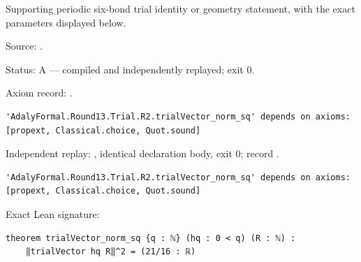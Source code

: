 \begin{theorem}[bp-432]
\label{bp-432}
\leanok
Supporting periodic six-bond trial identity or geometry statement, with the exact parameters displayed below.

\par Source: \texttt{}.
\par Status: A — compiled and independently replayed; exit 0.
\par Axiom record: \texttt{}.
\begin{verbatim}
'AdalyFormal.Round13.Trial.R2.trialVector_norm_sq' depends on axioms: [propext, Classical.choice, Quot.sound]
\end{verbatim}
\par Independent replay: \texttt{}, identical declaration body, exit 0; record \texttt{}.
\begin{verbatim}
'AdalyFormal.Round13.Trial.R2.trialVector_norm_sq' depends on axioms: [propext, Classical.choice, Quot.sound]
\end{verbatim}
\par Exact Lean signature:
\begin{verbatim}
theorem trialVector_norm_sq {q : ℕ} (hq : 0 < q) (R : ℕ) :
    ‖trialVector hq R‖^2 = (21/16 : ℝ)
\end{verbatim}
\end{theorem}

